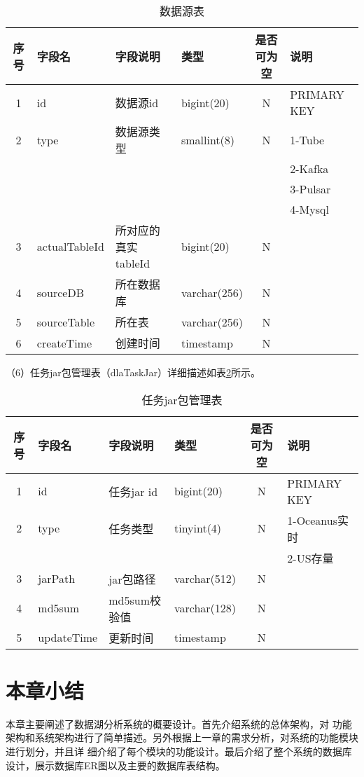 \begin{table}[H]
  \centering
  \caption{数据源表}
  \label{tab:数据源表}
  \begin{tabular}{clllcl}
    \toprule
    序号  & 字段名              & 字段说明           & 类型           & 是否可为空   & 说明  \\
    \midrule
    1    & id                 & 数据源id           & bigint(20)    & N          & PRIMARY KEY    \\
    2    & type               & 数据源类型          & smallint(8)   & N          & 1-Tube   \\
         &                    &                   &               &            & 2-Kafka  \\
         &                    &                   &               &            & 3-Pulsar  \\
         &                    &                   &               &            & 4-Mysql  \\
    3    & actualTableId      & 所对应的真实tableId  & bigint(20)   & N          &   \\
    4    & sourceDB           & 所在数据库          & varchar(256)  & N          &   \\
    5    & sourceTable        & 所在表             & varchar(256)  & N          &   \\
    6    & createTime         & 创建时间           & timestamp     & N          &    \\
    \bottomrule
  \end{tabular}
\end{table}

（6）任务jar包管理表（dlaTaskJar）详细描述如表\ref{tab:任务jar包管理表}所示。

\begin{table}[H]
  \centering
  \caption{任务jar包管理表}
  \label{tab:任务jar包管理表}
  \begin{tabular}{clllcl}
    \toprule
    序号  & 字段名              & 字段说明           & 类型           & 是否可为空   & 说明  \\
    \midrule
    1    & id                 & 任务jar id        & bigint(20)     & N          & PRIMARY KEY    \\
    2    & type               & 任务类型           & tinyint(4)    & N           & 1-Oceanus实时   \\
         &                    &                   &               &            & 2-US存量   \\
    3    & jarPath            & jar包路径         & varchar(512)   & N          &   \\
    4    & md5sum             & md5sum校验值      & varchar(128)   & N          &   \\
    5    & updateTime         & 更新时间           & timestamp     & N          &   \\
    \bottomrule
  \end{tabular}
\end{table}

\section{本章小结}

本章主要阐述了数据湖分析系统的概要设计。首先介绍系统的总体架构，对
功能架构和系统架构进行了简单描述。另外根据上一章的需求分析，对系统的功能模块进行划分，并且详
细介绍了每个模块的功能设计。最后介绍了整个系统的数据库设计，展示数据库ER图以及主要的数据库表结构。

